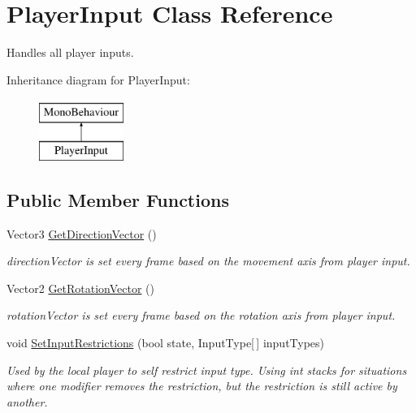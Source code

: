 \hypertarget{class_player_input}{}\section{Player\+Input Class Reference}
\label{class_player_input}


Handles all player inputs.  


Inheritance diagram for Player\+Input\+:\begin{figure}[H]
\begin{center}
\leavevmode
\includegraphics[height=2.000000cm]{class_player_input}
\end{center}
\end{figure}
\subsection*{Public Member Functions}
\begin{DoxyCompactItemize}
\item 
Vector3 \hyperlink{class_player_input_a2e54d5137932455e223719b97faee11e}{Get\+Direction\+Vector} ()
\begin{DoxyCompactList}\small\item\em direction\+Vector is set every frame based on the movement axis from player input. \end{DoxyCompactList}\item 
Vector2 \hyperlink{class_player_input_ab3fdfb50d2249378777418c368c88ab1}{Get\+Rotation\+Vector} ()
\begin{DoxyCompactList}\small\item\em rotation\+Vector is set every frame based on the rotation axis from player input. \end{DoxyCompactList}\item 
void \hyperlink{class_player_input_a36250201429a47f8d4e9c6e814257324}{Set\+Input\+Restrictions} (bool state, Input\+Type\mbox{[}$\,$\mbox{]} input\+Types)
\begin{DoxyCompactList}\small\item\em Used by the local player to self restrict input type. Using int stacks for situations where one modifier removes the restriction, but the restriction is still active by another. \end{DoxyCompactList}\end{DoxyCompactItemize}

